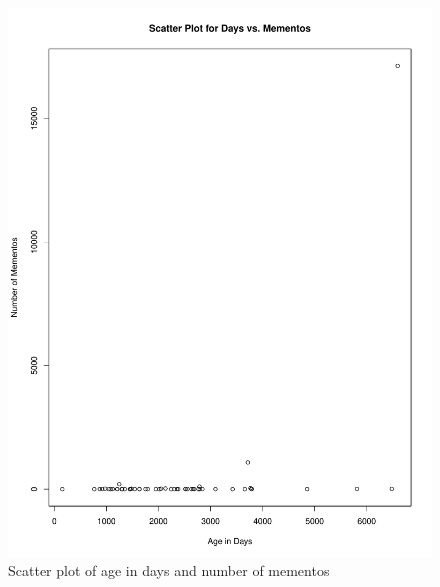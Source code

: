 \documentclass[letterpaper,11pt]{article}
\begin{document}
\begin{figure}[h]
\centering
\includegraphics[scale=0.6]{carbonDateScatterplot.pdf}
\caption{Scatter plot of age in days and number of mementos}
\label{fig:scatterplot}
\end{figure}

\clearpage
\end{document}
